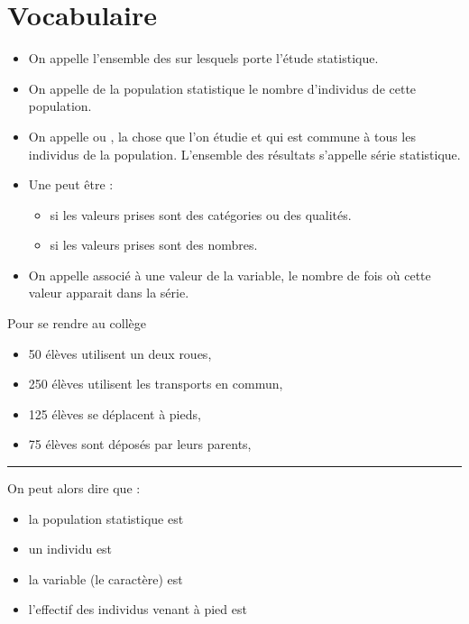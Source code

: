 \section{Vocabulaire}

\begin{definition}
\begin{itemize}[label=\textbullet]
    \item On appelle  l'ensemble 
        des  sur lesquels porte l'étude statistique. 
    \item On appelle  de la population statistique le
        nombre d'individus de cette population. 
    \item On appelle  ou , la chose que l'on étudie
        et qui est commune à tous les individus de la population. L'ensemble des
        résultats s'appelle série statistique.
    \item Une  peut être :
        \begin{itemize}[label=\textbullet]
            \item {} si les valeurs prises sont des catégories
                ou des qualités.
            \item {} si les valeurs prises sont des nombres.
        \end{itemize}
    \item On appelle  associé à une valeur de la variable, le nombre de
        fois où cette valeur apparait dans la série.
\end{itemize}
\end{definition}

\begin{exe}
    Pour se rendre au collège

    \begin{itemize}[label=\textbullet]
        \item 50 élèves utilisent un deux roues,
        \item 250 élèves utilisent les transports en commun,
        \item 125 élèves se déplacent à pieds,
        \item 75 élèves sont déposés par leurs parents,
    \end{itemize}
    \begin{center}\rule{0.7\textwidth}{0.2pt}\end{center}
    On peut alors dire que :
    \begin{itemize}[label=\textbullet]
        \item la population statistique est 
        \item un individu est 
        \item la variable (le caractère) est 
        \item l'effectif des individus venant à pied est 
    \end{itemize}
\end{exe}

